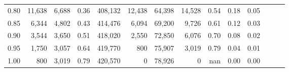 \begin{tabular}{rrrrrrrrrrrrrr}
0.80 &  11,638 &  6,688 &  0.36 &  408,132 &   12,438 &  64,398 &  14,528 &  0.54 &  0.18 &      0.05 \\
0.85 &   6,344 &  4,802 &  0.43 &  414,476 &    6,094 &  69,200 &   9,726 &  0.61 &  0.12 &      0.03 \\
0.90 &   3,544 &  3,650 &  0.51 &  418,020 &    2,550 &  72,850 &   6,076 &  0.70 &  0.08 &      0.02 \\
0.95 &   1,750 &  3,057 &  0.64 &  419,770 &      800 &  75,907 &   3,019 &  0.79 &  0.04 &      0.01 \\
1.00 &     800 &  3,019 &  0.79 &  420,570 &        0 &  78,926 &       0 &   nan &  0.00 &      0.00 \\
\bottomrule
\end{tabular}
